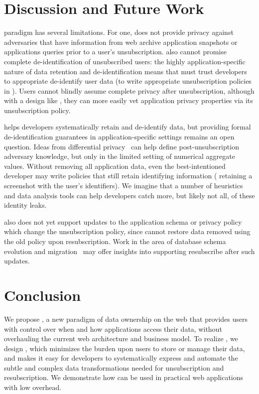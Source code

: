 \section{Discussion and Future Work}
\name paradigm has several limitations.
For one, \name does not provide privacy against adversaries that have information from web archive
application snapshots or applications queries prior to a user's unsubscription. \name also cannot
promise complete de-identification of unsubscribed users: the highly application-specific nature of
data retention and de-identification means that \name must trust developers to appropriate
de-identify user data (\eg to write appropriate unsubscription policies in \sys). Users cannot
blindly assume complete privacy after unsubscription, although with a design like \sys, they can
more easily vet application privacy properties via its unsubscription policy.

\sys helps developers systematically retain and de-identify data, but providing formal
de-identification guarantees in application-specific settings remains an open question. Ideas from
differential privacy~\cite{pinq} can help define post-unsubscription adversary knowledge, but only
in the limited setting of numerical aggregate values.  Without removing all application data, even
the best-intentioned developer may write policies that still retain identifying information (\eg
retaining a screenshot with the user's identifiers). We imagine that a number of heuristics and data
analysis tools can help developers catch more, but likely not all, of these identity leaks.

\sys also does not yet support updates to the application schema or privacy policy which change the
unsubscription policy, since \sys cannot restore data removed using the old policy upon
resubscription. Work in the area of database schema evolution and migration~\cite{schema:evo} may
offer insights into supporting resubscribe after such updates.

\section{Conclusion}
We propose \name, a new paradigm of data ownership on the web that provides users with control over
when and how applications access their data, without overhauling the current web architecture and
business model. To realize \name, we design \sys, which minimizes the burden upon users to store or
manage their data, and makes it easy for developers to systematically express and automate the
subtle and complex data transformations needed for unsubscription and resubscription. We demonstrate
how \sys can be used in practical web applications with low overhead.

